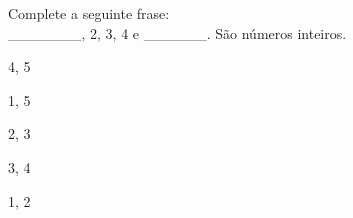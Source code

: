 \question[10]
Complete a seguinte frase:\\
_______, 2, 3, 4 e ______. São números inteiros.
\\
\begin{choices}
\item 4, 5 
\item 1, 5 %
\item 2, 3
\item 3, 4 
\item 1, 2 
\end{choices}
\answerline

